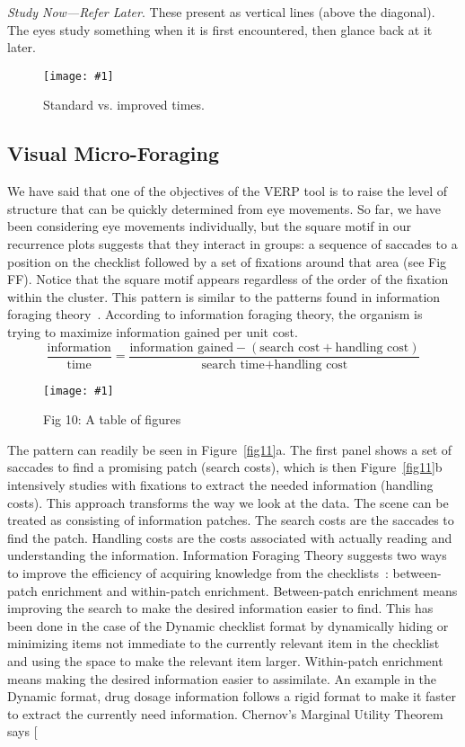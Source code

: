 \documentclass{sigchi}
\newcommand{\insertpicture}[2]{\begin{center}\texttt{[image: \#1]}\end{center}}
\begin{document}
\emph{Study Now—Refer Later}. These present as vertical lines (above the
diagonal). The eyes study something when it is first encountered, then
glance back at it later.



\begin{figure}
	\insertpicture{figures/time.pdf}{0.5}
	\caption{Standard vs. improved times.\label{fig:time}}
\end{figure}


\subsection{Visual Micro-Foraging} 
We have said that one of the objectives of the VERP tool is to raise the
level of structure that can be quickly determined from eye movements. So
far, we have been considering eye movements individually, but the square
motif in our recurrence plots suggests that they interact in groups: a
sequence of saccades to a position on the checklist followed by a set of
fixations around that area (see Fig FF).  Notice that the square motif
appears regardless of the order of the fixation within the cluster. This
pattern is similar to the patterns found in information foraging
theory~\cite{Pirolli_1999}. According to information foraging theory, the
organism is trying to maximize information gained per unit cost.
\[ 
\frac{
\text{information}
}{
\text{time}
}
= \frac{\text{information gained}-\left(\text{search cost} + \text{handling cost}\right)
}{
\text{search time} + \text{handling cost}
}
\]

\begin{figure*}

	\insertpicture{figures/dummy.eps}{0.8}
	\caption{Fig 10: A table of figures \label{fig10}}

\end{figure*}

The pattern can readily be seen in Figure~\ref{fig11}a. The first panel 
shows a set of saccades to find a promising patch (search costs), which is then 
Figure~\ref{fig11}b intensively studies with fixations to extract the 
needed information (handling costs).  This approach transforms the way we 
look at the data. The scene can be treated as consisting of information patches. The search
costs are the saccades to find the patch. Handling costs are the costs
associated with actually reading and understanding the information.
Information Foraging Theory suggests two ways to improve the efficiency of
acquiring knowledge from the checklists~\cite{Pirolli_1999}: between-patch enrichment
and within-patch enrichment. Between-patch enrichment means improving the
search to make the desired information easier to find. This has been done
in the case of the Dynamic checklist format by dynamically hiding or
minimizing items not immediate to the currently relevant item in the
checklist and using the space to make the relevant item larger.
Within-patch enrichment means making the desired information easier to
assimilate. An example in the Dynamic format, drug dosage information
follows a rigid format to make it faster to extract the currently need
information. Chernov’s Marginal Utility Theorem~\cite{Stephens_1986)} says [
\end{document}
